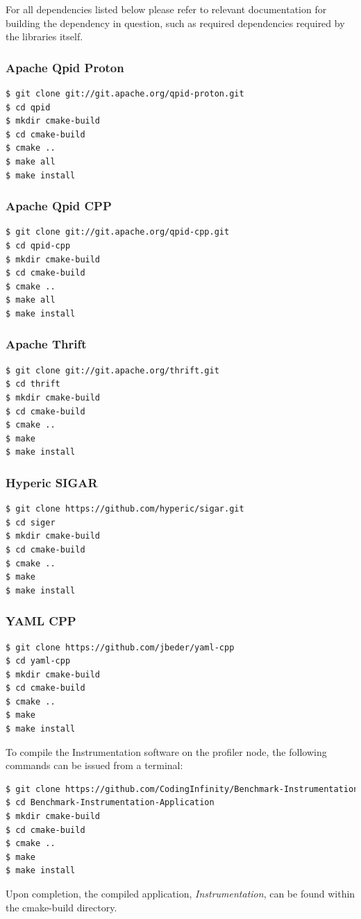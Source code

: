 \documentclass[11pt,a4paper]{article}
\begin{document}
For all dependencies listed below please refer to relevant documentation for
building the dependency in question, such as required dependencies required by
the libraries itself.

\subsubsection{Apache Qpid Proton}
\begin{lstlisting}[language=bash]
$ git clone git://git.apache.org/qpid-proton.git
$ cd qpid
$ mkdir cmake-build
$ cd cmake-build
$ cmake ..
$ make all
$ make install
\end{lstlisting}

\subsubsection{Apache Qpid CPP}
\begin{lstlisting}[language=bash]
$ git clone git://git.apache.org/qpid-cpp.git
$ cd qpid-cpp
$ mkdir cmake-build
$ cd cmake-build
$ cmake ..
$ make all
$ make install
\end{lstlisting}

\subsubsection{Apache Thrift}
\begin{lstlisting}[language=bash]
$ git clone git://git.apache.org/thrift.git
$ cd thrift
$ mkdir cmake-build
$ cd cmake-build
$ cmake ..
$ make
$ make install
\end{lstlisting}

\subsubsection{Hyperic SIGAR}
\begin{lstlisting}[language=bash]
$ git clone https://github.com/hyperic/sigar.git
$ cd siger
$ mkdir cmake-build
$ cd cmake-build
$ cmake ..
$ make
$ make install
\end{lstlisting}

\subsubsection{YAML CPP}
\begin{lstlisting}[language=bash]
$ git clone https://github.com/jbeder/yaml-cpp
$ cd yaml-cpp
$ mkdir cmake-build
$ cd cmake-build
$ cmake ..
$ make
$ make install
\end{lstlisting}

To compile the Instrumentation software on the profiler node, the following
commands can be issued from a terminal:
\begin{lstlisting}[language=bash]
$ git clone https://github.com/CodingInfinity/Benchmark-Instrumentation-Application.git
$ cd Benchmark-Instrumentation-Application
$ mkdir cmake-build
$ cd cmake-build
$ cmake ..
$ make
$ make install
\end{lstlisting}

Upon completion, the compiled application, \textit{Instrumentation}, can be
found within the cmake-build directory. 
\end{document}
